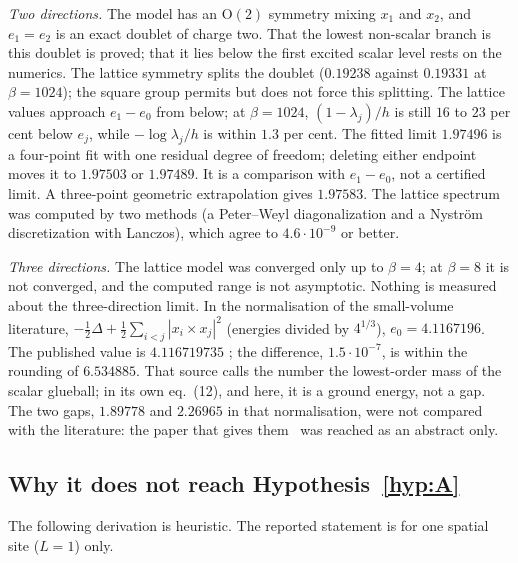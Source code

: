 \emph{Two directions.} The model has an $\mathrm{O}(2)$ symmetry mixing $x_1$ and $x_2$, and $e_1=e_2$ is an
exact doublet of charge two. That the lowest non-scalar branch is this doublet is proved; that it lies
below the first excited scalar level rests on the numerics. The lattice symmetry splits the doublet
($0.19238$ against $0.19331$ at $\beta=1024$); the square group permits but does not force this splitting.
The lattice values approach $e_1-e_0$ from below; at $\beta=1024$, $(1-\lambda_j)/h$ is still $16$ to
$23$ per cent below $e_j$, while $-\log\lambda_j/h$ is within $1.3$ per cent.
The fitted limit $1.97496$ is a four-point fit with one residual degree of freedom; deleting either endpoint
moves it to $1.97503$ or $1.97489$. It is a comparison with $e_1-e_0$, not a certified limit. A three-point
geometric extrapolation gives $1.97583$.
The lattice spectrum was computed by two methods (a Peter--Weyl diagonalization and a Nystr\"om
discretization with Lanczos), which agree to $4.6\cdot10^{-9}$ or better.

\emph{Three directions.} The lattice model was converged only up to $\beta=4$; at $\beta=8$ it is not
converged, and the computed range is not asymptotic. Nothing is measured about the three-direction limit.
In the normalisation of the small-volume literature, $-\tfrac12\Delta+\tfrac12\sum_{i<j}|x_i\times x_j|^2$
(energies divided by $4^{1/3}$), $e_0=4.1167196$. The published value is $4.116719735$
\cite[text after eq.~(12)]{vB00}; the difference, $1.5\cdot10^{-7}$, is within the rounding of
$6.534885$. That source calls the number the lowest-order mass of the scalar glueball; in its own
eq.~(12), and here, it is a ground energy, not a gap. The two gaps, $1.89778$ and $2.26965$ in that
normalisation, were not compared with the literature: the paper that gives them~\cite{LM84} was reached
as an abstract only.

\subsection{Why it does not reach Hypothesis~\ref{hyp:A}}\label{sb:sub-why}
The following derivation is heuristic. The reported statement is for one spatial site ($L=1$) only.

